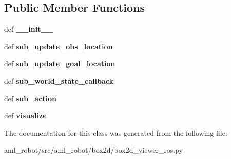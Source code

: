 \subsection*{Public Member Functions}
\begin{DoxyCompactItemize}
\item 
\hypertarget{classaml__robot_1_1box2d_1_1box2d__viewer__ros_1_1_box2_d_viewer_r_o_s_a07cd2d418ddd29bcbc733227904fc098}{def {\bfseries \-\_\-\-\_\-init\-\_\-\-\_\-}}\label{classaml__robot_1_1box2d_1_1box2d__viewer__ros_1_1_box2_d_viewer_r_o_s_a07cd2d418ddd29bcbc733227904fc098}

\item 
\hypertarget{classaml__robot_1_1box2d_1_1box2d__viewer__ros_1_1_box2_d_viewer_r_o_s_afbb308136a739ecbe02a0c3a8fd2e76b}{def {\bfseries sub\-\_\-update\-\_\-obs\-\_\-location}}\label{classaml__robot_1_1box2d_1_1box2d__viewer__ros_1_1_box2_d_viewer_r_o_s_afbb308136a739ecbe02a0c3a8fd2e76b}

\item 
\hypertarget{classaml__robot_1_1box2d_1_1box2d__viewer__ros_1_1_box2_d_viewer_r_o_s_adba31badf78240ade6e77dae4ffd9e37}{def {\bfseries sub\-\_\-update\-\_\-goal\-\_\-location}}\label{classaml__robot_1_1box2d_1_1box2d__viewer__ros_1_1_box2_d_viewer_r_o_s_adba31badf78240ade6e77dae4ffd9e37}

\item 
\hypertarget{classaml__robot_1_1box2d_1_1box2d__viewer__ros_1_1_box2_d_viewer_r_o_s_a34e9e348f9178e200e98b1d189ef9ddb}{def {\bfseries sub\-\_\-world\-\_\-state\-\_\-callback}}\label{classaml__robot_1_1box2d_1_1box2d__viewer__ros_1_1_box2_d_viewer_r_o_s_a34e9e348f9178e200e98b1d189ef9ddb}

\item 
\hypertarget{classaml__robot_1_1box2d_1_1box2d__viewer__ros_1_1_box2_d_viewer_r_o_s_aa0dc3a8b4837f57c2ea6ae6cad35c9df}{def {\bfseries sub\-\_\-action}}\label{classaml__robot_1_1box2d_1_1box2d__viewer__ros_1_1_box2_d_viewer_r_o_s_aa0dc3a8b4837f57c2ea6ae6cad35c9df}

\item 
\hypertarget{classaml__robot_1_1box2d_1_1box2d__viewer__ros_1_1_box2_d_viewer_r_o_s_a8e42fb881e38c74a9090e4239cecae87}{def {\bfseries visualize}}\label{classaml__robot_1_1box2d_1_1box2d__viewer__ros_1_1_box2_d_viewer_r_o_s_a8e42fb881e38c74a9090e4239cecae87}

\end{DoxyCompactItemize}


The documentation for this class was generated from the following file\-:\begin{DoxyCompactItemize}
\item 
aml\-\_\-robot/src/aml\-\_\-robot/box2d/box2d\-\_\-viewer\-\_\-ros.\-py\end{DoxyCompactItemize}
